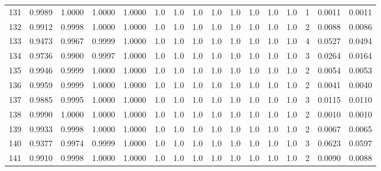 \begin{tabular}{lrrrrrrrrrrrrrrr}
131 &      0.9989 &  1.0000 &  1.0000 &  1.0000 &     1.0 &     1.0 &     1.0 &     1.0 &     1.0 &     1.0 &      1.0 &        1.0 &      1 &                    0.0011 &                     0.0011 \\
132 &      0.9912 &  0.9998 &  1.0000 &  1.0000 &     1.0 &     1.0 &     1.0 &     1.0 &     1.0 &     1.0 &      1.0 &        1.0 &      2 &                    0.0088 &                     0.0086 \\
133 &      0.9473 &  0.9967 &  0.9999 &  1.0000 &     1.0 &     1.0 &     1.0 &     1.0 &     1.0 &     1.0 &      1.0 &        1.0 &      4 &                    0.0527 &                     0.0494 \\
134 &      0.9736 &  0.9900 &  0.9997 &  1.0000 &     1.0 &     1.0 &     1.0 &     1.0 &     1.0 &     1.0 &      1.0 &        1.0 &      3 &                    0.0264 &                     0.0164 \\
135 &      0.9946 &  0.9999 &  1.0000 &  1.0000 &     1.0 &     1.0 &     1.0 &     1.0 &     1.0 &     1.0 &      1.0 &        1.0 &      2 &                    0.0054 &                     0.0053 \\
136 &      0.9959 &  0.9999 &  1.0000 &  1.0000 &     1.0 &     1.0 &     1.0 &     1.0 &     1.0 &     1.0 &      1.0 &        1.0 &      2 &                    0.0041 &                     0.0040 \\
137 &      0.9885 &  0.9995 &  1.0000 &  1.0000 &     1.0 &     1.0 &     1.0 &     1.0 &     1.0 &     1.0 &      1.0 &        1.0 &      3 &                    0.0115 &                     0.0110 \\
138 &      0.9990 &  1.0000 &  1.0000 &  1.0000 &     1.0 &     1.0 &     1.0 &     1.0 &     1.0 &     1.0 &      1.0 &        1.0 &      2 &                    0.0010 &                     0.0010 \\
139 &      0.9933 &  0.9998 &  1.0000 &  1.0000 &     1.0 &     1.0 &     1.0 &     1.0 &     1.0 &     1.0 &      1.0 &        1.0 &      2 &                    0.0067 &                     0.0065 \\
140 &      0.9377 &  0.9974 &  0.9999 &  1.0000 &     1.0 &     1.0 &     1.0 &     1.0 &     1.0 &     1.0 &      1.0 &        1.0 &      3 &                    0.0623 &                     0.0597 \\
141 &      0.9910 &  0.9998 &  1.0000 &  1.0000 &     1.0 &     1.0 &     1.0 &     1.0 &     1.0 &     1.0 &      1.0 &        1.0 &      2 &                    0.0090 &                     0.0088 \\

\end{tabular}
